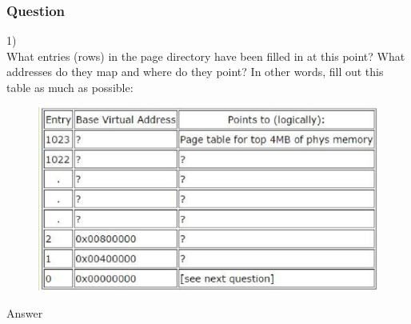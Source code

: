 \subsubsection{Question }
\begin{flushleft}
1)\\
What entries (rows) in the page directory have been filled in at this point? What addresses do they map and where do they point? In other words, fill out this table as much as possible:
\begin{figure}[H]
\centering
\includegraphics[width=0.8\linewidth]{figure/question4}
\end{figure}
\end{flushleft}
\begin{flushleft}
{\Large Answer}
\end{flushleft}

